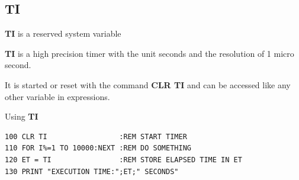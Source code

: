 \newpage
\subsection{TI}
\begin{description}[leftmargin=2cm,style=nextline]
\item [Format:] {\bf TI} is a reserved system variable
\item [Usage:]  {\bf TI} is a high precision timer with
                the unit seconds and the
                resolution of 1 micro second.

                It is started or reset with the command
                {\bf CLR TI} and can be accessed like any
                other variable in expressions.

\item [Example:] Using {\bf TI}
\begin{tcolorbox}[colback=black,coltext=white]
\verbatimfont{\codefont}
\begin{verbatim}
100 CLR TI                 :REM START TIMER
110 FOR I%=1 TO 10000:NEXT :REM DO SOMETHING
120 ET = TI                :REM STORE ELAPSED TIME IN ET
130 PRINT "EXECUTION TIME:";ET;" SECONDS"
\end{verbatim}
\end{tcolorbox}
\end{description}


\newpage

